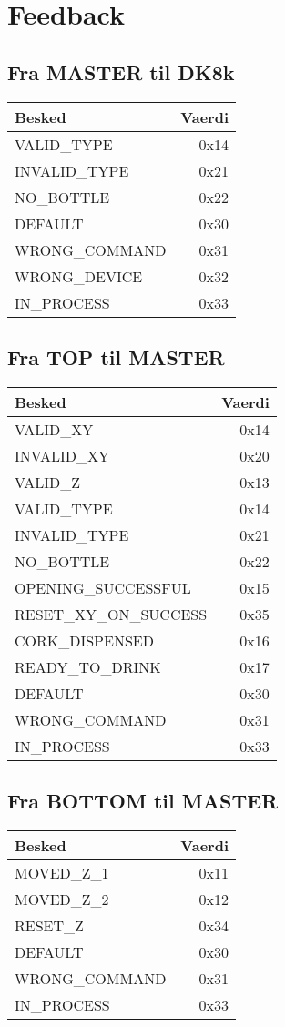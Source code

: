 \section{Feedback}
\subsection{Fra MASTER til DK8k}

\begin{table}[H]
\begin{tabular}{| l | r |}
\hline
Besked & Vaerdi\\\hline
VALID\_TYPE & 0x14\\\hline
INVALID\_TYPE & 0x21\\\hline
NO\_BOTTLE & 0x22\\\hline
DEFAULT & 0x30\\\hline
WRONG\_COMMAND & 0x31\\\hline
WRONG\_DEVICE & 0x32\\\hline
IN\_PROCESS & 0x33\\\hline
\end{tabular}
\end{table}

\subsection{Fra TOP til MASTER}

\begin{table}[H]
\begin{tabular}{| l | r |}
\hline
Besked & Vaerdi\\\hline
VALID\_XY & 0x14\\\hline
INVALID\_XY & 0x20\\\hline
VALID\_Z & 0x13\\\hline
VALID\_TYPE & 0x14\\\hline
INVALID\_TYPE & 0x21\\\hline
NO\_BOTTLE & 0x22\\\hline
OPENING\_SUCCESSFUL & 0x15\\\hline
RESET\_XY\_ON\_SUCCESS & 0x35\\\hline
CORK\_DISPENSED & 0x16\\\hline
READY\_TO\_DRINK & 0x17\\\hline
DEFAULT & 0x30\\\hline
WRONG\_COMMAND & 0x31\\\hline
IN\_PROCESS & 0x33\\\hline
\end{tabular}
\end{table}

\subsection{Fra BOTTOM til MASTER}

\begin{table}[H]
\begin{tabular}{| l | r |}
\hline
Besked & Vaerdi\\\hline
MOVED\_Z\_1 & 0x11\\\hline
MOVED\_Z\_2 & 0x12\\\hline
RESET\_Z & 0x34\\\hline
DEFAULT & 0x30\\\hline
WRONG\_COMMAND & 0x31\\\hline
IN\_PROCESS & 0x33\\\hline
\end{tabular}
\end{table}